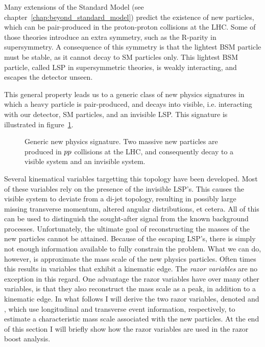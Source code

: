 

Many extensions of the Standard Model (see chapter~\ref{chap:beyond_standard_model}) predict the 
existence of new particles, which can be pair-produced in the proton-proton collisions at the LHC. 
Some of those theories introduce an extra symmetry, such as the R-parity in supersymmetry. A
consequence of this symmetry is that the lightest BSM particle must be stable, as it cannot decay
to SM particles only. This lightest BSM particle, called LSP in supersymmetric theories, is weakly
interacting, and escapes the detector unseen. 

This general property leads us to a generic class of new physics signatures in which a heavy
particle is pair-produced, and decays into visible, i.e. interacting with our detector, SM
particles, and an invisible LSP. This signature is illustrated in figure~\ref{fig:razor_signature}.

\begin{figure}[htpb]
  \centering
  \caption{Generic new physics signature. Two massive new particles are produced in ${p}{p}$
collisions at the LHC, and consequently decay to a visible system and an invisible system. 
\label{fig:razor_signature}}
\end{figure}

Several kinematical variables targetting this topology have been developed.
Most of these variables rely on the presence of the invisible LSP's. This causes the visible system
to deviate from a di-jet topology, resulting in possibly large missing transverse momentum, altered
angular distributions, et cetera. All of this can be used to distinguish the sought-after signal
from the known background processes. 
Unfortunately, the ultimate goal of reconstructing the masses of the new particles cannot be
attained. Because of the escaping LSP's, there is simply not enough information available to fully
constrain the problem. What we can do, however, is approximate the mass scale of the new physics
particles. Often times this results in variables that exhibit a kinematic edge. 
The \textit{razor variables} \cite{rogan,Rogan:1557072} are no exception in this regard. One
advantage the razor variables have over many other variables, is that they also reconstruct the
mass scale as a peak, in addition to a kinematic edge. 
In what follows I will derive the two razor variables, denoted \mr and \rsq, which use longitudinal
and transverse event information, respectively, to estimate a characteristic mass scale associated
with the new particles. At the end of this section I will briefly show how the razor variables are
used in the razor boost analysis. 

